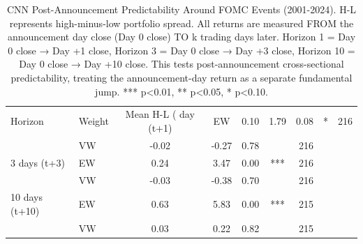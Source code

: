 \begin{table}
\caption{CNN Post-Announcement Predictability Around FOMC Events (2001-2024). H-L represents high-minus-low portfolio spread. All returns are measured FROM the announcement day close (Day 0 close) TO k trading days later. Horizon 1 = Day 0 close → Day +1 close, Horizon 3 = Day 0 close → Day +3 close, Horizon 10 = Day 0 close → Day +10 close. This tests post-announcement cross-sectional predictability, treating the announcement-day return as a separate fundamental jump. *** p<0.01, ** p<0.05, * p<0.10.}
\label{tab:fomc_results}
\begin{tabular}{llccccr}
\toprule
Horizon & Weight & Mean H-L (%
 day (t+1) & EW & 0.10 & 1.79 & 0.08 & * & 216 \\
 & VW & -0.02 & -0.27 & 0.78 &  & 216 \\
3 days (t+3) & EW & 0.24 & 3.47 & 0.00 & *** & 216 \\
 & VW & -0.03 & -0.38 & 0.70 &  & 216 \\
10 days (t+10) & EW & 0.63 & 5.83 & 0.00 & *** & 215 \\
 & VW & 0.03 & 0.22 & 0.82 &  & 215 \\
\bottomrule
\end{tabular}
\end{table}
